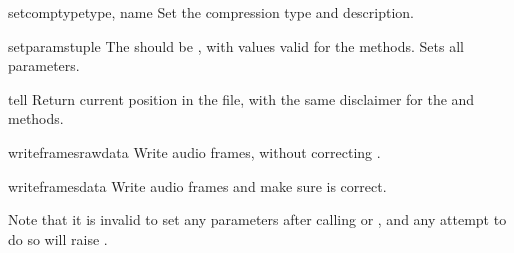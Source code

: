 \begin{methoddesc}{setcomptype}{type, name}
Set the compression type and description.
\end{methoddesc}

\begin{methoddesc}{setparams}{tuple}
The  should be , with
values valid for the  methods.  Sets all parameters.
\end{methoddesc}

\begin{methoddesc}{tell}{}
Return current position in the file, with the same disclaimer for
the  and 
methods.
\end{methoddesc}

\begin{methoddesc}{writeframesraw}{data}
Write audio frames, without correcting .
\end{methoddesc}

\begin{methoddesc}{writeframes}{data}
Write audio frames and make sure  is correct.
\end{methoddesc}

Note that it is invalid to set any parameters after calling
 or , and any attempt
to do so will raise .
